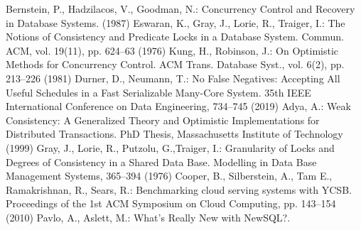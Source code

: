 

%
\begin{thebibliography}{8}
%
Bernstein, P., Hadzilacos, V., Goodman, N.:
Concurrency Control and Recovery in Database Systems. (1987)
%
Eswaran, K., Gray, J., Lorie, R., Traiger, I.:
The Notions of Consistency and Predicate Locks in a Database System.
Commun. {ACM}, vol. 19(11), pp. 624--63 (1976)
%
Kung, H., Robinson, J.:
On Optimistic Methods for Concurrency Control.
{ACM} Trans. Database Syst., vol. 6(2), pp. 213--226 (1981)
%
Durner, D., Neumann, T.: No False Negatives: Accepting All Useful Schedules in a Fast Serializable Many-Core System. 35th {IEEE} International Conference on Data Engineering, 734--745 (2019) 
%
%
Adya, A.: Weak {C}onsistency: {A} {G}eneralized {T}heory and {O}ptimistic {I}mplementations for {D}istributed {T}ransactions. PhD Thesis, Massachusetts Institute of Technology (1999)
%
Gray, J., Lorie, R., Putzolu, G.,Traiger, I.:
{G}ranularity of {L}ocks and {D}egrees of {C}onsistency in a {S}hared {D}ata {B}ase. 
Modelling in Data Base Management Systems, 365--394 (1976)
%
Cooper, B., Silberstein, A., Tam E., Ramakrishnan, R., Sears, R.:
Benchmarking cloud serving systems with {YCSB}.
Proceedings of the 1st {ACM} Symposium on Cloud Computing, pp. 143--154 (2010)
%
%
%
%
Pavlo, A., Aslett, M.: 
What's Really New with NewSQL?.

\end{thebibliography}
